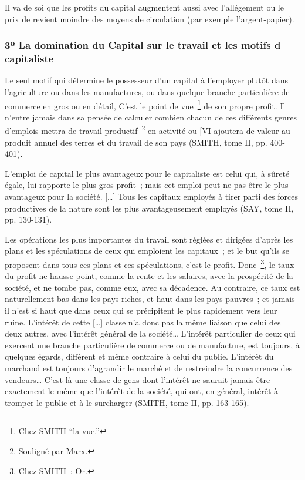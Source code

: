 \documentclass[french,twoside]{book} %
\newenvironment{quoteblock}%
  {\begin{quoting}}
  {\end{quoting}}
\newenvironment{quotebar}{%
    \def\FrameCommand{{\color{rubric!10!}\vrule width 0.5em} \hspace{0.9em}}%
    \def\OuterFrameSep{\itemsep} %
    \MakeFramed {\advance\hsize-\width \FrameRestore}
  }%
  {%
    \endMakeFramed
  }
\renewenvironment{quoteblock}%
  {%
    \savenotes
    \setstretch{0.9}
    \normalfont
    \begin{quotebar}
  }
  {%
    \end{quotebar}
    \spewnotes
  }
\begin{document}
\noindent Il va de soi que les profits du capital augmentent aussi avec l’allégement ou le prix de revient moindre des moyens de circulation (par exemple l’argent-papier).
\subsubsection[{3º La domination du Capital sur le travail et les motifs d capitaliste}]{3º La domination du Capital sur le travail et les motifs d capitaliste}

\begin{quoteblock}
 \noindent Le seul motif qui détermine le possesseur d’un capital à l’employer plutôt dans l’agriculture ou dans les manufactures, ou dans quelque branche particulière de commerce en gros ou en détail, C’est le point de vue \footnote{Chez SMITH “la vue.”} de son propre profit. Il n’entre jamais dans sa pensée de calculer combien chacun de ces différents genres d’emplois mettra de travail productif \footnote{Souligné par Marx.} en activité ou [VI ajoutera de valeur au produit annuel des terres et du travail de son pays (SMITH, tome II, pp. 400-401).\par
 L’emploi de capital le plus avantageux pour le capitaliste est celui qui, à sûreté égale, lui rapporte le plus gros profit ; mais cet emploi peut ne pas être le plus avantageux pour la société. […] Tous les capitaux employés à tirer parti des forces productives de la nature sont les plus avantageusement employés (SAY, tome II, pp. 130-131).\par
 Les opérations les plus importantes du travail sont réglées et dirigées d’après les plans et les spéculations de ceux qui emploient les capitaux ; et le but qu’ils se proposent dans tous ces plans et ces spéculations, c’est le profit. Donc \footnote{Chez SMITH : Or.}, le taux du profit ne hausse point, comme la rente et les salaires, avec la prospérité de la société, et ne tombe pas, comme eux, avec sa décadence. Au contraire, ce taux est naturellement bas dans les pays riches, et haut dans les pays pauvres ; et jamais il n’est si haut que dans ceux qui se précipitent le plus rapidement vers leur ruine. L’intérêt de cette […] classe n’a donc pas la même liaison que celui des deux autres, avec l’intérêt général de la société… L’intérêt particulier de ceux qui exercent une branche particulière de commerce ou de manufacture, est toujours, à quelques égards, différent et même contraire à celui du publie. L’intérêt du marchand est toujours d’agrandir le marché et de restreindre la concurrence des vendeurs… C’est là une classe de gens dont l’intérêt ne saurait jamais être exactement le même que l’intérêt de la société, qui ont, en général, intérêt à tromper le publie et à le surcharger (SMITH, tome II, pp. 163-165).
 \end{quoteblock}
\end{document}
